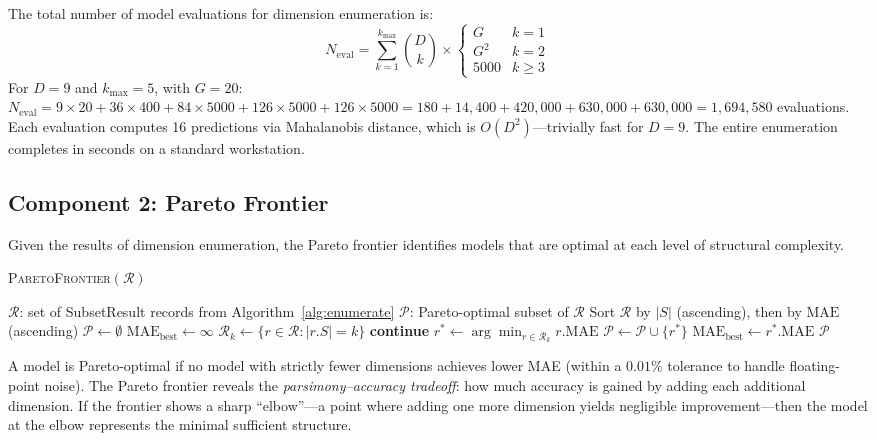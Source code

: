 \documentclass[12pt]{article}
\newcommand{\MAE}{\mathrm{MAE}}
\begin{document}
The total number of model evaluations for dimension enumeration is:
\begin{equation}
    N_{\mathrm{eval}} = \sum_{k=1}^{k_{\max}} \binom{D}{k} \times \begin{cases} G & k = 1 \\ G^2 & k = 2 \\ 5000 & k \geq 3 \end{cases}
\end{equation}
For $D = 9$ and $k_{\max} = 5$, with $G = 20$: $N_{\mathrm{eval}} = 9 \times 20 + 36 \times 400 + 84 \times 5000 + 126 \times 5000 + 126 \times 5000 = 180 + 14{,}400 + 420{,}000 + 630{,}000 + 630{,}000 = 1{,}694{,}580$ evaluations.  Each evaluation computes 16 predictions via Mahalanobis distance, which is $O(D^2)$---trivially fast for $D = 9$.  The entire enumeration completes in seconds on a standard workstation.

\subsection{Component 2: Pareto Frontier}

Given the results of dimension enumeration, the Pareto frontier identifies models that are optimal at each level of structural complexity.

\begin{algorithm}[H]
\caption{\textsc{ParetoFrontier}$(\mathcal{R})$}
\label{alg:pareto}
\begin{algorithmic}[1]
\REQUIRE $\mathcal{R}$: set of SubsetResult records from Algorithm~\ref{alg:enumerate}
\ENSURE $\mathcal{P}$: Pareto-optimal subset of $\mathcal{R}$
\STATE Sort $\mathcal{R}$ by $|S|$ (ascending), then by $\MAE$ (ascending)
\STATE $\mathcal{P} \leftarrow \emptyset$
\STATE $\MAE_{\mathrm{best}} \leftarrow \infty$
    \STATE $\mathcal{R}_k \leftarrow \{r \in \mathcal{R} : |r.S| = k\}$
        \STATE \textbf{continue}
    \ENDIF
    \STATE $r^* \leftarrow \arg\min_{r \in \mathcal{R}_k} r.\MAE$
    \IF{$r^*.\MAE < \MAE_{\mathrm{best}} \times (1 - 10^{-4})$} %
        \STATE $\mathcal{P} \leftarrow \mathcal{P} \cup \{r^*\}$
        \STATE $\MAE_{\mathrm{best}} \leftarrow r^*.\MAE$
    \ENDIF
\ENDFOR
\RETURN $\mathcal{P}$
\end{algorithmic}
\end{algorithm}

A model is Pareto-optimal if no model with strictly fewer dimensions achieves lower MAE (within a $0.01\%$ tolerance to handle floating-point noise).  The Pareto frontier reveals the \emph{parsimony--accuracy tradeoff}: how much accuracy is gained by adding each additional dimension.  If the frontier shows a sharp ``elbow''---a point where adding one more dimension yields negligible improvement---then the model at the elbow represents the minimal sufficient structure.
\end{document}
